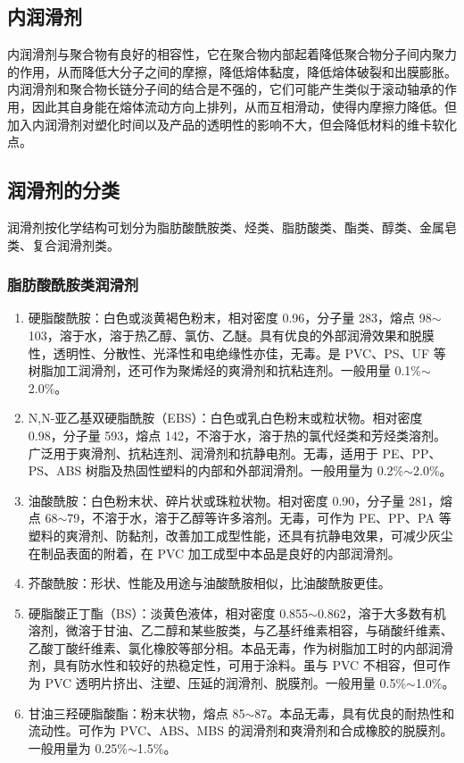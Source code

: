 \subsection{内润滑剂}
内润滑剂与聚合物有良好的相容性，它在聚合物内部起着降低聚合物分子间内聚力的作用，从而降低大分子之间的摩擦，降低熔体黏度，降低熔体破裂和出膜膨胀。内润滑剂和聚合物长链分子间的结合是不强的，它们可能产生类似于滚动轴承的作用，因此其自身能在熔体流动方向上排列，从而互相滑动，使得内摩擦力降低。但加入内润滑剂对塑化时间以及产品的透明性的影响不大，但会降低材料的维卡软化点。

\subsection{润滑剂的分类}
润滑剂按化学结构可划分为脂肪酸酰胺类、烃类、脂肪酸类、酯类、醇类、金属皂类、复合润滑剂类。

\subsubsection{脂肪酸酰胺类润滑剂}

\begin{enumerate}[(1) ]
    \item 硬脂酸酰胺：白色或淡黄褐色粉末，相对密度 0.96，分子量 283，熔点 98$\sim$103\cd，溶于水，溶于热乙醇、氯仿、乙醚。具有优良的外部润滑效果和脱膜性，透明性、分散性、光泽性和电绝缘性亦佳，无毒。是 PVC、PS、UF 等树脂加工润滑剂，还可作为聚烯烃的爽滑剂和抗粘连剂。一般用量 0.1\%$\sim$2.0\%。
    \item N,N-亚乙基双硬脂酰胺（EBS）：白色或乳白色粉末或粒状物。相对密度 0.98，分子量 593，熔点 142\cd，不溶于水，溶于热的氯代烃类和芳烃类溶剂。广泛用于爽滑剂、抗粘连剂、润滑剂和抗静电剂。无毒，适用于 PE、PP、PS、ABS 树脂及热固性塑料的内部和外部润滑剂。一般用量为 0.2\%$\sim$2.0\%。
    \item 油酸酰胺：白色粉末状、碎片状或珠粒状物。相对密度 0.90，分子量 281，熔点 68$\sim$79\cd，不溶于水，溶于乙醇等许多溶剂。无毒，可作为 PE、PP、PA 等塑料的爽滑剂、防黏剂，改善加工成型性能，还具有抗静电效果，可减少灰尘在制品表面的附着，在 PVC 加工成型中本品是良好的内部润滑剂。
    \item 芥酸酰胺：形状、性能及用途与油酸酰胺相似，比油酸酰胺更佳。
    \item 硬脂酸正丁酯（BS）：淡黄色液体，相对密度 0.855$\sim$0.862，溶于大多数有机溶剂，微溶于甘油、乙二醇和某些胺类，与乙基纤维素相容，与硝酸纤维素、乙酸丁酸纤维素、氯化橡胶等部分相。本品无毒，作为树脂加工时的内部润滑剂，具有防水性和较好的热稳定性，可用于涂料。虽与 PVC 不相容，但可作为 PVC 透明片挤出、注塑、压延的润滑剂、脱膜剂。一般用量 0.5\%$\sim$1.0\%。
    \item 甘油三羟硬脂酸酯：粉末状物，熔点 85$\sim$87\cd。本品无毒，具有优良的耐热性和流动性。可作为 PVC、ABS、MBS 的润滑剂和爽滑剂和合成橡胶的脱膜剂。一般用量为 0.25\%$\sim$1.5\%。
\end{enumerate}

